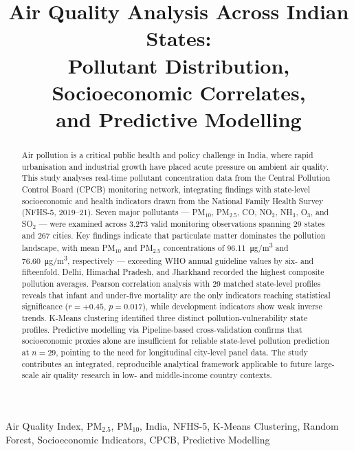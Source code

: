 \documentclass[10pt, conference]{IEEEtran}
\title{Air Quality Analysis Across Indian States:\\
Pollutant Distribution, Socioeconomic Correlates,\\
and Predictive Modelling}
\author{
  \IEEEauthorblockN{Sayon Mitra}
  \IEEEauthorblockA{
    \textit{B.Tech Computer Science and Engineering}\\
    \textit{Chandigarh University}\\
    Uttar Pradesh, India\\
    UID: 25LBCS1407\\
    \href{mailto:25lbcs1407@culkomail.in}{25lbcs1407@culkomail.in}\\
    \href{mailto:sayon@sayonedu.in}{sayon@sayonedu.in}
  }
}
\begin{document}
\maketitle

\begin{abstract}
Air pollution is a critical public health and policy challenge
in India, where rapid urbanisation and industrial growth have
placed acute pressure on ambient air quality.
This study analyses real-time pollutant concentration data
from the Central Pollution Control Board (CPCB) monitoring
network, integrating findings with state-level socioeconomic
and health indicators drawn from the National Family Health
Survey (NFHS-5, 2019--21).
Seven major pollutants --- PM$_{10}$, PM$_{2.5}$, CO,
NO$_{2}$, NH$_{3}$, O$_3$, and SO$_{2}$ --- were examined
across 3{,}273 valid monitoring observations spanning 29
states and 267 cities.
Key findings indicate that particulate matter dominates the
pollution landscape, with mean PM$_{10}$ and PM$_{2.5}$
concentrations of 96.11~\si{\micro g/m^3} and
76.60~\si{\micro g/m^3}, respectively --- exceeding WHO
annual guideline values by six- and fifteenfold.
Delhi, Himachal Pradesh, and Jharkhand recorded the highest
composite pollution averages.
Pearson correlation analysis with 29 matched state-level
profiles reveals that infant and under-five mortality are the
only indicators reaching statistical significance
($r = {+}0.45$, $p = 0.017$), while development indicators
show weak inverse trends.
K-Means clustering identified three distinct
pollution-vulnerability state profiles.
Predictive modelling via Pipeline-based cross-validation
confirms that socioeconomic proxies alone are insufficient
for reliable state-level pollution prediction at $n = 29$,
pointing to the need for longitudinal city-level panel data.
The study contributes an integrated, reproducible analytical
framework applicable to future large-scale air quality
research in low- and middle-income country contexts.
\end{abstract}

\begin{IEEEkeywords}
Air Quality Index, PM$_{2.5}$, PM$_{10}$, India, NFHS-5,
K-Means Clustering, Random Forest, Socioeconomic Indicators,
CPCB, Predictive Modelling
\end{IEEEkeywords}

\end{document}
